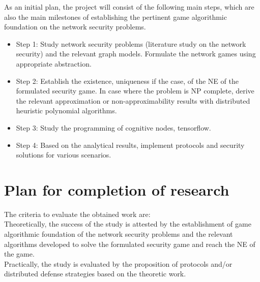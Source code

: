 \documentclass[10pt]{article}
\theoremstyle{definition}
\begin{document}
As an initial plan, the project will consist of the following main steps, which are also the main milestones of establishing the pertinent game algorithmic foundation on the network security problems.
\begin{itemize}
	\item Step 1: Study network security problems (literature study on the
    network security) and the relevant graph models. Formulate the network games using appropriate abstraction.
	\item Step 2: Establish the existence, uniqueness if the case, of the NE of the formulated security game. In case where the problem is NP complete, derive the relevant approximation or non-approximability results with distributed heuristic polynomial algorithms.
	\item Step 3: Study the programming of cognitive nodes, tensorflow.
	\item Step 4: Based on the analytical results, implement protocols and security solutions for various scenarios.
\end{itemize}


\section{Plan for completion of research}

The criteria to evaluate the obtained work are:
\\ Theoretically, the success of the study is attested by the establishment of game algorithmic
foundation of the network security problems and the relevant algorithms developed to solve the
formulated security game and reach the NE of the game.
\\ Practically, the study is evaluated by the proposition of protocols and/or distributed defense
strategies based on the theoretic work.
\end{document}
